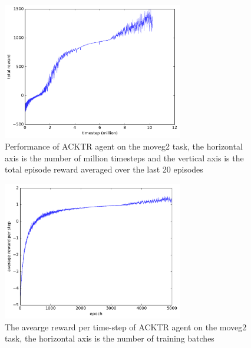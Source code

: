 \begin{figure}[!htbp]
	\includegraphics[width=0.7\textwidth]{images/rec_180528_statlog.pdf}
	\centering
	\caption{Performance of ACKTR agent on the moveg2 task, the horizontal axis is the number of million timesteps and the vertical axis is the total episode reward averaged over the last 20 episodes}\label{rec_stat_moveg2}
\end{figure}

\begin{figure}[!htbp]
	\includegraphics[width=0.7\textwidth]{images/rec_180528_meanrt_statlog.pdf}
	\centering
	\caption{The avearge reward per time-step of ACKTR agent on the moveg2 task, the horizontal axis is the number of training batches}\label{rec_stat_moveg2_meanrt}
\end{figure}

